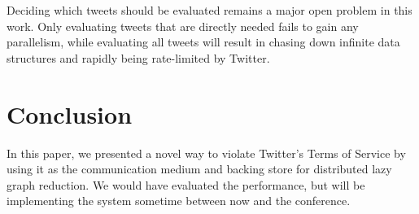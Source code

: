 \documentclass[preprint]{sigplanconf}
\begin{document}
Deciding which tweets should be evaluated remains a major open problem
in this work. Only evaluating tweets that are directly needed fails to
gain any parallelism, while evaluating all tweets will result in
chasing down infinite data structures and rapidly being rate-limited
by Twitter.


\section{Conclusion}
In this paper, we presented a novel way to violate Twitter's Terms of
Service \cite{twitterTOS} by using it as the communication medium and
backing store for distributed lazy graph reduction.
We would have evaluated the performance, but will be implementing the
system sometime between now and the conference.


{}

\end{document}
